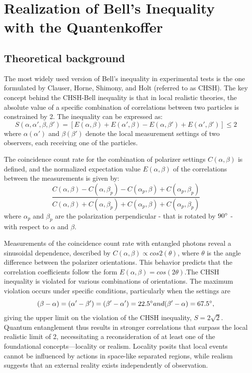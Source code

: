 \section{Realization of Bell's Inequality with the Quantenkoffer}

\subsection{Theoretical background}
\label{sec:theoretical_background}

The most widely used version of Bell's inequality in experimental tests is the one formulated by Clauser, Horne, Shimony, and Holt (referred to as \acs{CHSH}). The key concept behind the \acs{CHSH}-Bell inequality is that in local realistic theories, the absolute value of a specific combination of correlations between two particles is constrained by 2. The inequality can be expressed as:
$$ S(\alpha, \alpha', \beta, \beta') = [E(\alpha, \beta) + E(\alpha', \beta) - E(\alpha, \beta') + E(\alpha', \beta')] \leq 2$$ 
where $\alpha(\alpha')$ and $\beta(\beta')$ denote the local measurement settings of two observers, each receiving one of the particles. 


The coincidence count rate for the combination of polarizer settings $C(\alpha,\beta)$ is defined, and the normalized expectation value $E(\alpha,\beta)$ of the correlations between the measurements is given by: 
$$ \frac{C(\alpha,\beta) - C(\alpha,\beta_p) - C(\alpha_p,\beta) + C(\alpha_p,\beta_p)}{C(\alpha,\beta) + C(\alpha,\beta_p) + C(\alpha_p,\beta) + C(\alpha_p,\beta_p)} $$
where $\alpha_p$ and $\beta_p$ are the polarization perpendicular - that is rotated by $90\degree$ - with respect to $\alpha$ and $\beta$.

Measurements of the coincidence count rate with entangled photons reveal a sinusoidal dependence, described by $ C(\alpha,\beta ) \propto cos 2(\theta)$, where $\theta$ is the angle difference between the polarizer orientations. This behavior predicts that the correlation coefficients follow the form $ E(\alpha,\beta)=cos(2\theta) $.The \acs{CHSH} inequality is violated for various combinations of orientations. The maximum violation occurs under specific conditions, particularly when the settings are $$(\beta - \alpha) = (\alpha' - \beta') = (\beta' - \alpha') = 22.5\degree and (\beta' - \alpha) = 67.5 \degree, $$ giving the upper limit on the violation of the \acs{CHSH} inequality, $S = 2\sqrt{2}$. Quantum entanglement thus results in stronger correlations that surpass the local realistic limit of 2, necessitating a reconsideration of at least one of the foundational concepts—locality or realism. Locality posits that local events cannot be influenced by actions in space-like separated regions, while realism suggests that an external reality exists independently of observation.

